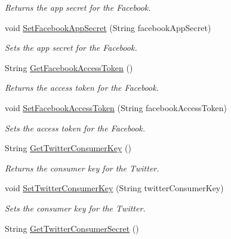 \begin{DoxyCompactItemize}
\begin{DoxyCompactList}\small\item\em Returns the app secret for the Facebook. \end{DoxyCompactList}\item 
void \hyperlink{classcom_1_1shephertz_1_1app42_1_1paas_1_1sdk_1_1windows_1_1social_1_1_social_a750c62fe174444961184d04a876cb63e}{Set\+Facebook\+App\+Secret} (String facebook\+App\+Secret)
\begin{DoxyCompactList}\small\item\em Sets the app secret for the Facebook. \end{DoxyCompactList}\item 
String \hyperlink{classcom_1_1shephertz_1_1app42_1_1paas_1_1sdk_1_1windows_1_1social_1_1_social_a99a0fe6270da3190b2fcea037740ae91}{Get\+Facebook\+Access\+Token} ()
\begin{DoxyCompactList}\small\item\em Returns the access token for the Facebook. \end{DoxyCompactList}\item 
void \hyperlink{classcom_1_1shephertz_1_1app42_1_1paas_1_1sdk_1_1windows_1_1social_1_1_social_a4d0a72b70ab0fa5a48bdcacc1e23206c}{Set\+Facebook\+Access\+Token} (String facebook\+Access\+Token)
\begin{DoxyCompactList}\small\item\em Sets the access token for the Facebook. \end{DoxyCompactList}\item 
String \hyperlink{classcom_1_1shephertz_1_1app42_1_1paas_1_1sdk_1_1windows_1_1social_1_1_social_a677505630f538ed659d36b198cc87e36}{Get\+Twitter\+Consumer\+Key} ()
\begin{DoxyCompactList}\small\item\em Returns the consumer key for the Twitter. \end{DoxyCompactList}\item 
void \hyperlink{classcom_1_1shephertz_1_1app42_1_1paas_1_1sdk_1_1windows_1_1social_1_1_social_a3e22b9d9a9e5a82f2127daead16c2e9e}{Set\+Twitter\+Consumer\+Key} (String twitter\+Consumer\+Key)
\begin{DoxyCompactList}\small\item\em Sets the consumer key for the Twitter. \end{DoxyCompactList}\item 
String \hyperlink{classcom_1_1shephertz_1_1app42_1_1paas_1_1sdk_1_1windows_1_1social_1_1_social_af6dde5b221bbb1ec7cadee8a1bed6aae}{Get\+Twitter\+Consumer\+Secret} ()

\end{DoxyCompactItemize}
